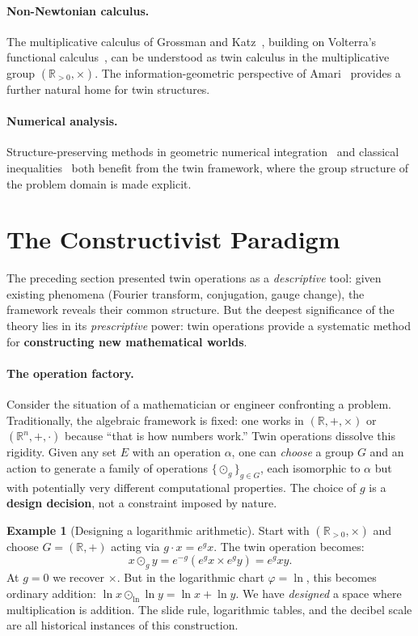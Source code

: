 \documentclass[11pt,a4paper,openany]{book}
\theoremstyle{plain}
\theoremstyle{definition}
\newtheorem{example}[theorem]{Example}
\newcommand{\twing}[1]{\odot_{#1}}
\newcommand{\actspace}{E}
\newcommand{\groupG}{G}
\newcommand{\RR}{\mathbb{R}}
\begin{document}
\paragraph{Non-Newtonian calculus.} The multiplicative calculus of Grossman and Katz~\cite{grossman2008}, building on Volterra's functional calculus~\cite{volterra1887}, can be understood as twin calculus in the multiplicative group $(\mathbb{R}_{>0}, \times)$. The information-geometric perspective of Amari~\cite{amari2000} provides a further natural home for twin structures.

\paragraph{Numerical analysis.} Structure-preserving methods in geometric numerical integration~\cite{hairer2006} and classical inequalities~\cite{hardy1952} both benefit from the twin framework, where the group structure of the problem domain is made explicit.


\section{The Constructivist Paradigm}

The preceding section presented twin operations as a \emph{descriptive} tool: given existing phenomena (Fourier transform, conjugation, gauge change), the framework reveals their common structure. But the deepest significance of the theory lies in its \emph{prescriptive} power: twin operations provide a systematic method for \textbf{constructing new mathematical worlds}.

\paragraph{The operation factory.} Consider the situation of a mathematician or engineer confronting a problem. Traditionally, the algebraic framework is fixed: one works in $(\RR, +, \times)$ or $(\RR^n, +, \cdot)$ because ``that is how numbers work.'' Twin operations dissolve this rigidity. Given any set $\actspace$ with an operation $\alpha$, one can \emph{choose} a group $\groupG$ and an action to generate a family of operations $\{\twing{g}\}_{g \in \groupG}$, each isomorphic to $\alpha$ but with potentially very different computational properties. The choice of $g$ is a \textbf{design decision}, not a constraint imposed by nature.

\begin{example}[Designing a logarithmic arithmetic]\label{ex:design-log}
Start with $(\RR_{>0}, \times)$ and choose $\groupG = (\RR, +)$ acting via $g \cdot x = e^g x$. The twin operation becomes:
\[
x \twing{g} y = e^{-g}(e^g x \times e^g y) = e^g xy.
\]
At $g = 0$ we recover $\times$. But in the logarithmic chart $\varphi = \ln$, this becomes ordinary addition: $\ln x \twing{\ln} \ln y = \ln x + \ln y$. We have \emph{designed} a space where multiplication is addition. The slide rule, logarithmic tables, and the decibel scale are all historical instances of this construction.
\end{example}
\end{document}
